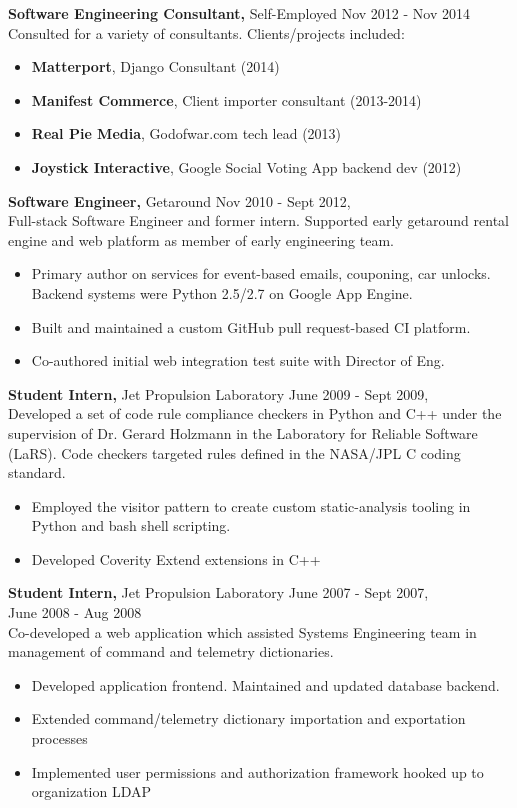 \documentclass[margin]{res}
\begin{document}
\begin{resume}
  {\bf Software Engineering Consultant,} Self-Employed   \hfill Nov 2012 - Nov 2014\\
  Consulted for a variety of consultants.  Clients/projects included:
  \begin{itemize}
    \item {\bf Matterport}, Django Consultant (2014)
    \item {\bf Manifest Commerce}, Client importer consultant (2013-2014)
    \item {\bf Real Pie Media}, Godofwar.com tech lead (2013)
    \item {\bf Joystick Interactive}, Google Social Voting App backend dev (2012)
  \end{itemize}

  {\bf Software Engineer,} Getaround \hfill Nov 2010 - Sept 2012, \\
  Full-stack Software Engineer and former intern.  Supported early getaround rental engine and web platform as member of early engineering team.
  \begin{itemize}
   \item Primary author on services for event-based emails, couponing, car unlocks.  Backend systems were Python 2.5/2.7 on Google App Engine.
    \item Built and maintained a custom GitHub pull request-based CI platform.
    \item Co-authored initial web integration test suite with Director of Eng.
  \end{itemize}

\pagebreak{}

{\bf Student Intern,} Jet Propulsion Laboratory \hfill June 2009 - Sept 2009, \\
 Developed a set of code rule compliance checkers in Python and C++ under the supervision of Dr. Gerard Holzmann in the Laboratory for Reliable Software (LaRS).  Code checkers targeted rules defined in the NASA/JPL C coding standard.
 \begin{itemize}
 \item Employed the visitor pattern to create custom static-analysis tooling in Python and bash shell scripting.
 \item Developed Coverity Extend extensions in C++
 \end{itemize}

 {\bf Student Intern,} Jet Propulsion Laboratory \hfill June 2007 - Sept 2007, \\
 \makebox[3.27in]{\hfill} June 2008 - Aug 2008 \\ 
 Co-developed a web application which assisted Systems Engineering team in management of command and telemetry dictionaries.
 \begin{itemize}
 \item Developed application frontend. Maintained and updated database backend.
 \item Extended command/telemetry dictionary importation and exportation processes
 \item Implemented user permissions and authorization framework hooked up to organization LDAP
 \end{itemize} 


\end{resume}
\end{document}
